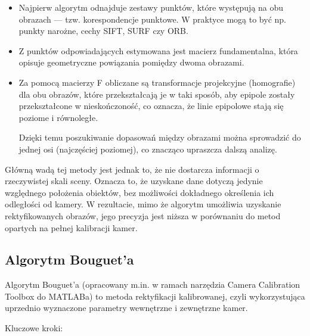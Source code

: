 \documentclass[magisterska]{pracadypl}
\begin{document}
\begin{itemize}
\item Najpierw algorytm odnajduje zestawy punktów, które występują na obu obrazach — tzw. korespondencje punktowe. W praktyce mogą to być np. punkty narożne, cechy SIFT, SURF czy ORB.

\item Z punktów odpowiadających estymowana jest macierz fundamentalna, która opisuje geometryczne powiązania pomiędzy dwoma obrazami.

\item Za pomocą macierzy F obliczane są transformacje projekcyjne (homografie) dla obu obrazów, które przekształcają je w taki sposób, aby epipole zostały przekształcone w nieskończoność, co oznacza, że linie epipolowe stają się poziome i równoległe.

Dzięki temu poszukiwanie dopasowań między obrazami można sprowadzić do jednej osi (najczęściej poziomej), co znacząco upraszcza dalszą analizę.
\end{itemize}

Główną wadą tej metody jest jednak to, że nie dostarcza informacji o rzeczywistej skali sceny. Oznacza to, że uzyskane dane dotyczą jedynie względnego położenia obiektów, bez możliwości dokładnego określenia ich odległości od kamery. W rezultacie, mimo że algorytm umożliwia uzyskanie rektyfikowanych obrazów, jego precyzja jest niższa w porównaniu do metod opartych na pełnej kalibracji kamer.

\subsection{Algorytm Bouguet'a}

Algorytm Bouguet’a \cite{bouget} (opracowany m.in. w ramach narzędzia Camera Calibration Toolbox do MATLABa) to metoda rektyfikacji kalibrowanej, czyli wykorzystująca uprzednio wyznaczone parametry wewnętrzne i zewnętrzne kamer.

\bigskip

Kluczowe kroki:
\end{document}
